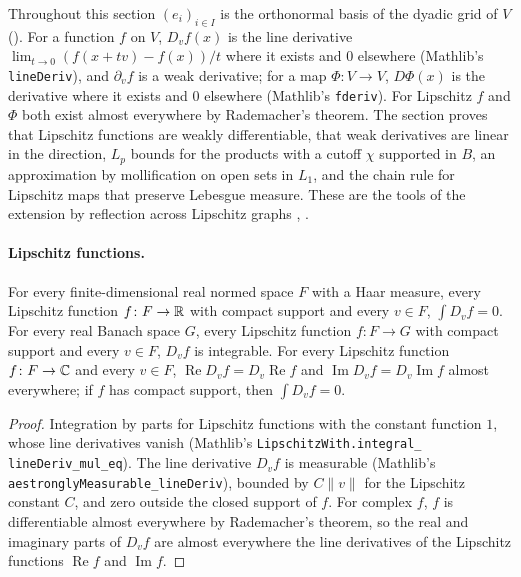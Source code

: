 Throughout this section $(e_i)_{i \in I}$ is the orthonormal basis of the dyadic grid of $V$
(). For a function $f$ on $V$, $D_v f(x)$ is the line derivative
$\lim_{t \to 0} (f(x + t v) - f(x))/t$ where it exists and $0$ elsewhere (Mathlib's
\texttt{lineDeriv}), and $\partial_v f$ is a weak derivative; for a map $\Phi \colon V \to V$,
$D\Phi(x)$ is the derivative where it exists and $0$ elsewhere (Mathlib's \texttt{fderiv}). For
Lipschitz $f$ and $\Phi$ both exist almost everywhere by Rademacher's theorem. The section
proves that Lipschitz functions are weakly differentiable, that weak derivatives are linear in
the direction, $L_p$ bounds for the products with a cutoff $\chi$ supported in $B$, an
approximation by mollification on open sets in $L_1$, and the chain rule for Lipschitz maps that
preserve Lebesgue measure. These are the tools of the extension by reflection across Lipschitz
graphs \cite[Section~4.4]{EvansGariepy}, \cite[Chapter~9]{Brezis2011}.

\paragraph{Lipschitz functions.}

\begin{lemma}
\label{lem:integral-line-derivative-zero}
\leanok
For every finite-dimensional real normed space $F$ with a Haar measure, every Lipschitz function
$f \colon F \to \mathbb{R}$ with compact support and every $v \in F$, $\int D_v f = 0$. For every
real Banach space $G$, every Lipschitz function $f \colon F \to G$ with compact support and every
$v \in F$, $D_v f$ is integrable. For every Lipschitz function $f \colon F \to \mathbb{C}$ and every
$v \in F$, $\operatorname{Re} D_v f = D_v \operatorname{Re} f$ and
$\operatorname{Im} D_v f = D_v \operatorname{Im} f$ almost everywhere; if $f$ has
compact support, then $\int D_v f = 0$.
\end{lemma}

\begin{proof}
\leanok
Integration by parts for Lipschitz functions with the constant function $1$, whose line
derivatives vanish (Mathlib's \texttt{LipschitzWith.\allowbreak integral\_\allowbreak
lineDeriv\_\allowbreak mul\_\allowbreak eq}). The line derivative $D_v f$ is measurable (Mathlib's
\texttt{aestronglyMeasurable\_\allowbreak lineDeriv}), bounded by $C \|v\|$ for the Lipschitz
constant $C$, and zero outside the closed support of $f$. For complex $f$, $f$ is
differentiable almost everywhere by Rademacher's theorem, so the real and imaginary parts of
$D_v f$ are almost everywhere the line derivatives of the Lipschitz functions
$\operatorname{Re} f$ and $\operatorname{Im} f$.
\end{proof}

